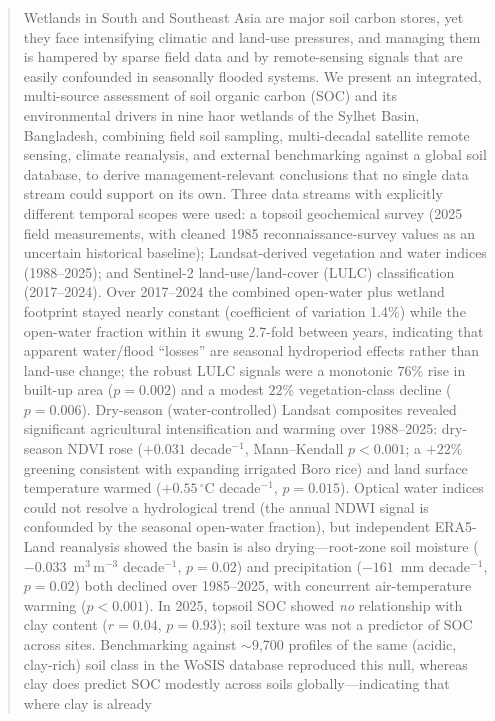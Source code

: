 \documentclass[preprint,authoryear,12pt]{elsarticle}
\begin{document}
\begin{frontmatter}
\begin{abstract}
Wetlands in South and Southeast Asia are major soil carbon stores, yet they face
intensifying climatic and land-use pressures, and managing them is hampered by sparse field
data and by remote-sensing signals that are easily confounded in seasonally flooded systems.
We present an integrated, multi-source assessment of soil organic carbon (SOC) and its
environmental drivers in nine haor wetlands of the Sylhet Basin, Bangladesh, combining field
soil sampling, multi-decadal satellite remote sensing, climate reanalysis, and external
benchmarking against a global soil database, to derive management-relevant conclusions that no
single data stream could support on its own.
Three data streams with explicitly different temporal scopes were used: a topsoil
geochemical survey (2025 field measurements, with cleaned 1985 reconnaissance-survey
values as an uncertain historical baseline); Landsat-derived vegetation and water
indices (1988--2025); and Sentinel-2 land-use/land-cover (LULC) classification
(2017--2024). Over 2017--2024 the combined open-water plus wetland footprint stayed nearly
constant (coefficient of variation 1.4\%) while the open-water fraction within it swung
2.7-fold between years, indicating that apparent water/flood ``losses'' are seasonal
hydroperiod effects rather than land-use change; the robust LULC signals were a monotonic
$76$\% rise in built-up area ($p=0.002$) and a modest $22$\% vegetation-class decline
($p=0.006$). Dry-season (water-controlled) Landsat composites revealed significant
agricultural intensification and warming over 1988--2025: dry-season NDVI rose
($+0.031$ decade$^{-1}$, Mann--Kendall $p<0.001$; a $+22$\% greening consistent with expanding
irrigated Boro rice) and land surface temperature warmed ($+0.55\,^{\circ}$C decade$^{-1}$,
$p=0.015$). Optical water indices could not resolve a hydrological trend (the annual NDWI signal
is confounded by the seasonal open-water fraction), but independent ERA5-Land reanalysis showed
the basin is also drying---root-zone soil moisture ($-0.033$~m$^3$\,m$^{-3}$ decade$^{-1}$,
$p=0.02$) and precipitation ($-161$~mm decade$^{-1}$, $p=0.02$) both declined over 1985--2025,
with concurrent air-temperature warming ($p<0.001$). In 2025, topsoil SOC showed \emph{no} relationship with clay content ($r=0.04$, $p=0.93$);
soil texture was not a predictor of SOC across sites. Benchmarking against $\sim$9{,}700 profiles
of the same (acidic, clay-rich) soil class in the WoSIS database reproduced this null, whereas
clay does predict SOC modestly across soils globally---indicating that where clay is already

\end{abstract}
\end{frontmatter}
\end{document}
